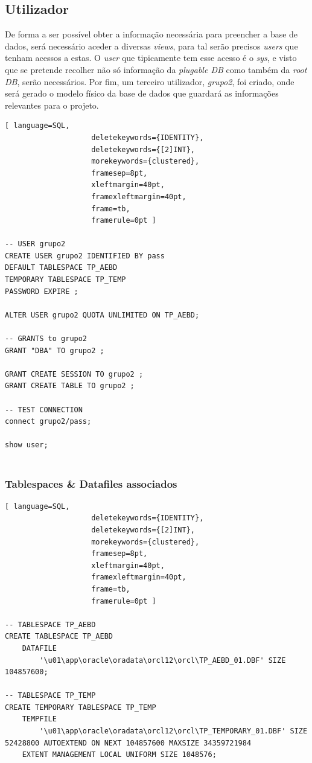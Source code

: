 \documentclass[a4paper]{article}
\begin{document}
\subsection{Utilizador}
\hspace{3mm} 
De forma a ser possível obter a informação necessária para preencher a base de dados, será necessário aceder a diversas \emph{views}, para tal serão precisos \emph{users} que tenham acessos a estas. O \emph{user} que tipicamente tem esse acesso é o \emph{sys}, e visto que se pretende recolher não só informação da \emph{plugable DB} como também da \emph{root DB}, serão necessários.
Por fim, um terceiro utilizador, \emph{grupo2}, foi criado, onde será gerado o modelo físico da base de dados que guardará as informações relevantes para o projeto.

\begin{lstlisting}[ language=SQL,
                    deletekeywords={IDENTITY},
                    deletekeywords={[2]INT},
                    morekeywords={clustered},
                    framesep=8pt,
                    xleftmargin=40pt,
                    framexleftmargin=40pt,
                    frame=tb,
                    framerule=0pt ]
                    
-- USER grupo2
CREATE USER grupo2 IDENTIFIED BY pass  
DEFAULT TABLESPACE TP_AEBD
TEMPORARY TABLESPACE TP_TEMP
PASSWORD EXPIRE ;

ALTER USER grupo2 QUOTA UNLIMITED ON TP_AEBD;

-- GRANTS to grupo2
GRANT "DBA" TO grupo2 ;

GRANT CREATE SESSION TO grupo2 ;
GRANT CREATE TABLE TO grupo2 ;

-- TEST CONNECTION
connect grupo2/pass;

show user;  
                    
\end{lstlisting}


\subsubsection{Tablespaces \& Datafiles associados}
\hspace{3mm}

\begin{lstlisting}[ language=SQL,
                    deletekeywords={IDENTITY},
                    deletekeywords={[2]INT},
                    morekeywords={clustered},
                    framesep=8pt,
                    xleftmargin=40pt,
                    framexleftmargin=40pt,
                    frame=tb,
                    framerule=0pt ]

-- TABLESPACE TP_AEBD
CREATE TABLESPACE TP_AEBD 
    DATAFILE 
        '\u01\app\oracle\oradata\orcl12\orcl\TP_AEBD_01.DBF' SIZE 104857600;

-- TABLESPACE TP_TEMP   
CREATE TEMPORARY TABLESPACE TP_TEMP 
    TEMPFILE 
        '\u01\app\oracle\oradata\orcl12\orcl\TP_TEMPORARY_01.DBF' SIZE 52428800 AUTOEXTEND ON NEXT 104857600 MAXSIZE 34359721984 
    EXTENT MANAGEMENT LOCAL UNIFORM SIZE 1048576;                    
                    
\end{lstlisting}
\end{document}
